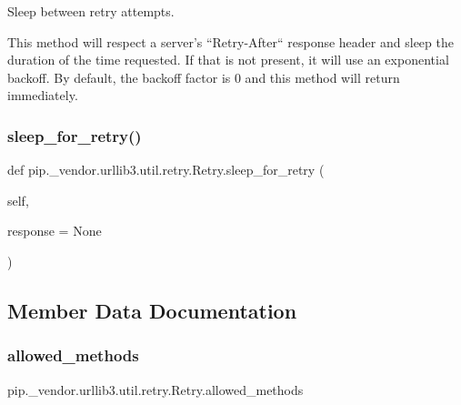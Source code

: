\begin{DoxyVerb}Sleep between retry attempts.

This method will respect a server's ``Retry-After`` response header
and sleep the duration of the time requested. If that is not present, it
will use an exponential backoff. By default, the backoff factor is 0 and
this method will return immediately.
\end{DoxyVerb}
 \mbox{\label{classpip_1_1__vendor_1_1urllib3_1_1util_1_1retry_1_1Retry_a82a91a77b0784a51e3236f847dd9b3a2}} 
\subsubsection{\texorpdfstring{sleep\+\_\+for\+\_\+retry()}{sleep\_for\_retry()}}
{\footnotesize\ttfamily def pip.\+\_\+vendor.\+urllib3.\+util.\+retry.\+Retry.\+sleep\+\_\+for\+\_\+retry (\begin{DoxyParamCaption}\item[{}]{self,  }\item[{}]{response = {\ttfamily None} }\end{DoxyParamCaption})}



\subsection{Member Data Documentation}
\mbox{\label{classpip_1_1__vendor_1_1urllib3_1_1util_1_1retry_1_1Retry_a565c1de580794a7996dcb3ab2dc4a6ef}} 
\subsubsection{\texorpdfstring{allowed\+\_\+methods}{allowed\_methods}}
{\footnotesize\ttfamily pip.\+\_\+vendor.\+urllib3.\+util.\+retry.\+Retry.\+allowed\+\_\+methods}

